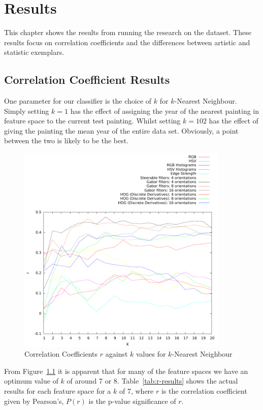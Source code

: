 \chapter{Results}

This chapter shows the results from running the research on the dataset. These results focus on 
correlation coefficients and the differences between artistic and statistic exemplars.

\section{Correlation Coefficient Results}
One parameter for our classifier is the choice of $k$ for $k$-Nearest Neighbour. Simply setting 
$k=1$ has the effect of assigning the year of the nearest painting in feature space to the current
test painting. Whilst setting $k=102$ has the effect of giving the painting the mean year of the 
entire data set. Obviously, a point between the two is likely to be the best. 

\begin{figure}[h]
\centering
\includegraphics[width=0.9\textwidth]{../../isispa-paper/results/mean}
\caption{Correlation Coefficients $r$ against $k$ values for $k$-Nearest Neighbour}\label{fig:r-graph}
\end{figure}

From Figure~\ref{fig:r-graph} it is apparent that for many of the feature spaces we have an
optimum value of $k$ of around 7 or 8. Table~\ref{tab:r-results} shows the actual results for each 
feature space for a $k$ of 7, where $r$ is the correlation coefficient given by Pearson's, 
$P(r)$ is the p-value significance of $r$.

